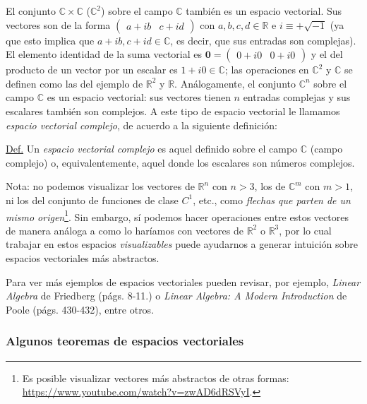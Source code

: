 \documentclass[apuntes]{subfiles}
\begin{document}
El conjunto $\mathbb{C}\times\mathbb{C}$ ($\mathbb{C}^2$) sobre el campo $\mathbb{C}$ también es un espacio vectorial. Sus vectores son de la forma $\begin{pmatrix}a+ib&c+id\end{pmatrix}$ con $a,b,c,d\in\mathbb{R}$ e $i\equiv+\sqrt{-1}$ (ya que esto implica que $a+ib, c+id\in\mathbb{C}$, es decir, que sus entradas son complejas). El elemento identidad de la suma vectorial es $\mathbf{0}=\begin{pmatrix}0+i0&0+i0\end{pmatrix}$ y el del producto de un vector por un escalar es $1 + i0\in\mathbb{C}$; las operaciones en $\mathbb{C}^2$ y $\mathbb{C}$ se definen como las del ejemplo de $\mathbb{R}^2$ y $\mathbb{R}$. Análogamente, el conjunto $\mathbb{C}^n$ sobre el campo $\mathbb{C}$ es un espacio vectorial: sus vectores tienen $n$ entradas complejas y sus escalares también son complejos. A este tipo de espacio vectorial le llamamos \textit{espacio vectorial complejo}, de acuerdo a la siguiente definición:

\vspace{1.5mm} 
\begin{tcolorbox}
\underline{Def.} Un \textit{espacio vectorial complejo} es aquel definido sobre el campo $\mathbb{C}$ (campo complejo) o, equivalentemente, aquel donde los escalares son números complejos.
\end{tcolorbox}{}

Nota: no podemos visualizar los vectores de $\mathbb{R}^n$ con $n>3$, los de $\mathbb{C}^m$ con $m>1$, ni los del conjunto de funciones de clase $C^1$, etc., como \emph{flechas que parten de un mismo origen}\footnote{Es posible visualizar vectores más abstractos de otras formas: \url{https://www.youtube.com/watch?v=zwAD6dRSVyI}.}. Sin embargo, sí podemos hacer operaciones entre estos vectores de manera análoga a como lo haríamos con vectores de $\mathbb{R}^2$ o $\mathbb{R}^3$, por lo cual trabajar en estos espacios \emph{visualizables} puede ayudarnos a generar intuición sobre espacios vectoriales más abstractos.

\vspace{3mm}
Para ver más ejemplos de espacios vectoriales pueden revisar, por ejemplo, \textit{Linear Algebra} de Friedberg (págs. 8-11.) o \textit{Linear Algebra: A Modern Introduction} de Poole (págs. 430-432), entre otros.

\subsubsection{Algunos teoremas de espacios vectoriales} \label{Teo:Espacios_vectoriales} 
\end{document}
